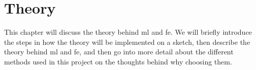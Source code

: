 \chapter{Theory}\label{cha:theory}
This chapter will discuss the theory behind \gls{ml} and \gls{fe}. We will briefly introduce the steps in how the theory will be implemented on a sketch, then describe the theory behind \gls{ml} and \gls{fe}, and then go into more detail about the different methods used in this project on the thoughts behind why choosing them.













